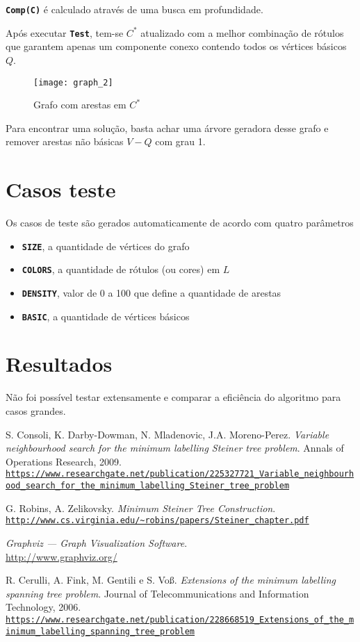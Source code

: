 \documentclass[12pt, a4paper]{article}
\newcommand{\ic}[1]{\textbf{\lstinline{#1}}}
\begin{document}
\ic{Comp(C)} é calculado através de uma busca em profundidade.

Após executar \ic{Test}, tem-se $ C^* $ atualizado com a melhor combinação de
rótulos que garantem apenas um componente conexo contendo todos os vértices
básicos $ Q $.

\begin{figure}[H]
    \centering
    \texttt{[image: graph\_2]}
    \caption{Grafo com arestas em $ C^* $}
    \label{fig:graph_2}
\end{figure}

Para encontrar uma solução, basta achar uma árvore geradora desse grafo e
remover arestas não básicas $ V - Q $ com grau 1.

\section{Casos teste}
Os casos de teste são gerados automaticamente de acordo com quatro parâmetros
\begin{itemize}
\item \ic{SIZE}, a quantidade de vértices do grafo
\item \ic{COLORS}, a quantidade de rótulos (ou cores) em $ L $
\item \ic{DENSITY}, valor de 0 a 100 que define a quantidade de arestas
\item \ic{BASIC}, a quantidade de vértices básicos
\end{itemize}

\section{Resultados}
Não foi possível testar extensamente e comparar a eficiência do algoritmo para
casos grandes.

\begin{thebibliography}{9}

S. Consoli, K. Darby-Dowman, N. Mladenovic, J.A. Moreno-Perez.
\textit{Variable neighbourhood search for the minimum labelling Steiner tree
problem}.
Annals of Operations Research, 2009.
\tiny
\\\texttt{\url{https://www.researchgate.net/publication/225327721_Variable_neighbourhood_search_for_the_minimum_labelling_Steiner_tree_problem}}
\normalsize

G. Robins, A. Zelikovsky.
\textit{Minimum Steiner Tree Construction}.
\tiny
\\\texttt{\url{http://www.cs.virginia.edu/~robins/papers/Steiner_chapter.pdf}}
\normalsize

\textit{Graphviz --- Graph Visualization Software}. \\
\url{http://www.graphviz.org/}

R. Cerulli, A. Fink, M. Gentili e S. Voß.
\textit{Extensions of the minimum labelling spanning tree problem}.
Journal of Telecommunications and Information Technology, 2006.
\tiny
\\\texttt{\url{https://www.researchgate.net/publication/228668519_Extensions_of_the_minimum_labelling_spanning_tree_problem}}
\normalsize
\end{thebibliography}
\end{document}
